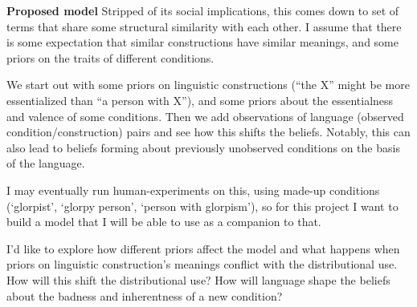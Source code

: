 \documentclass[11pt]{article}
\begin{document}
\textbf{Proposed model}
Stripped of its social implications, this comes down to set of terms that share some structural similarity with each other. I assume that there is some expectation that similar constructions have similar meanings, and some priors on the traits of different conditions.

We start out with some priors on linguistic constructions (``the X'' might be more essentialized than ``a person with X''), and some priors about the essentialness and valence of some conditions. Then we add observations of language (observed condition/construction) pairs and see how this shifts the beliefs. Notably, this can also lead to beliefs forming about previously unobserved conditions on the basis of the language. 

I may eventually run human-experiments on this, using made-up conditions (`glorpist', `glorpy person', `person with glorpism'), so for this project I want to build a model that I will be able to use as a companion to that. 

I'd like to explore how different priors affect the model and what happens when priors on linguistic construction's meanings conflict with the distributional use. How will this shift the distributional use? How will language shape the beliefs about the badness and inherentness of a new condition? 

\end{document}
